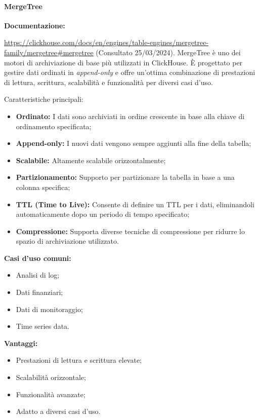 \paragraph{MergeTree}\label{sec:MergeTree}
\textbf{Documentazione:}

\url{https://clickhouse.com/docs/en/engines/table-engines/mergetree-family/mergetree#mergetree} (Consultato 25/03/2024).\newline
MergeTree è uno dei motori di archiviazione di base più utilizzati in ClickHouse. È progettato per gestire dati ordinati in \textit{append-only} e offre un'ottima combinazione di prestazioni di lettura, scrittura, scalabilità e funzionalità per diversi casi d'uso.

Caratteristiche principali:
\begin{itemize}
	\item \textbf{Ordinato:} I dati sono archiviati in ordine crescente in base alla chiave di ordinamento specificata;
	\item \textbf{Append-only:} I nuovi dati vengono sempre aggiunti alla fine della tabella;
	\item \textbf{Scalabile:} Altamente scalabile orizzontalmente;
	\item \textbf{Partizionamento:} Supporto per partizionare la tabella in base a una colonna specifica;
	\item \textbf{TTL (Time to Live):} Consente di definire un TTL per i dati, eliminandoli automaticamente dopo un periodo di tempo specificato;
	\item \textbf{Compressione:} Supporta diverse tecniche di compressione per ridurre lo spazio di archiviazione utilizzato.
\end{itemize}

\textbf{Casi d'uso comuni:}
\begin{itemize}
  \item Analisi di log;
  \item Dati finanziari;
  \item Dati di monitoraggio;
  \item Time series data.
\end{itemize}

\textbf{Vantaggi:}
\begin{itemize}
  \item Prestazioni di lettura e scrittura elevate;
  \item Scalabilità orizzontale;
  \item Funzionalità avanzate;
  \item Adatto a diversi casi d'uso.
\end{itemize}

